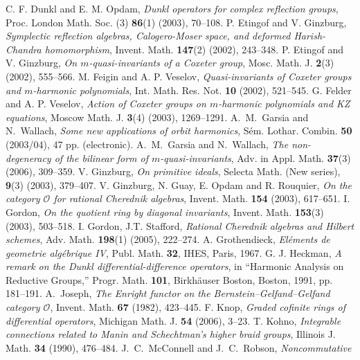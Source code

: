 \documentclass{amsart}
\theoremstyle{definition}
\theoremstyle{remark}
\numberwithin{equation}{section}
\begin{document}
\begin{thebibliography}{A}
C. F. Dunkl and E. M. Opdam, \textit{Dunkl operators for complex reflection groups}, Proc. London Math. Soc. (3) \textbf{86}(1) (2003), 70--108.
 P. Etingof and V. Ginzburg,
\textit{Symplectic reflection algebras, Calogero-Moser space, and deformed
Harish-Chandra homomorphism}, Invent. Math. \textbf{147}(2) (2002), 243--348.
  P. Etingof and V. Ginzburg, \textit{On $m$-quasi-invariants
of a Coxeter group}, Mosc. Math. J. \textbf{2}(3) (2002), 555--566.
M. Feigin and A. P. Veselov,
\textit{Quasi-invariants of Coxeter groups and $m$-harmonic polynomials},
Int. Math. Res. Not. \textbf{10} (2002), 521--545.
G. Felder  and A. P. Veselov, \textit{Action of Coxeter groups on $m$-harmonic polynomials
and KZ equations}, Moscow Math. J. \textbf{3}(4) (2003), 1269--1291.
A.~M.~Garsia and N.~Wallach, \textit{Some new applications of orbit harmonics},
S\'em. Lothar. Combin. \textbf{50} (2003/04), 47 pp. (electronic).
A.~M.~Garsia and N.~Wallach, \textit{The non-degeneracy of the bilinear
form of $m$-quasi-invariants},  Adv. in Appl. Math.
\textbf{37}(3) (2006), 309--359.
 V. Ginzburg, \textit{On primitive ideals}, Selecta
Math. (New series), \textbf{9}(3) (2003), 379--407.
V. Ginzburg, N. Guay, E. Opdam and R. Rouquier, \textit{On the category
$\mathcal O$ for rational Cherednik algebras}, Invent. Math. \textbf{154}
(2003), 617--651.
 I. Gordon,
\textit{On the quotient ring by diagonal invariants},
Invent. Math. \textbf{153}(3) (2003), 503--518.
 I. Gordon, J.T. Stafford, \textit{Rational
Cherednik algebras and Hilbert schemes}, Adv. Math. \textbf{198}(1)
(2005), 222--274.
 A. Grothendieck, \textit{El\'ements de geometrie
alg\'ebrique IV}, Publ. Math. \textbf{32}, IHES, Paris, 1967.
G. J. Heckman, \textit{A remark on the Dunkl differential-difference operators},
in ``Harmonic Analysis on Reductive Groups,''
Progr. Math. \textbf{101}, Birkh\"auser Boston, Boston, 1991, pp. 181--191.
A.~Joseph, \textit{The Enright functor on the
Bernstein--Gelfand--Gelfand category ${\mathcal{O}}$}, Invent. Math.
\textbf{67} (1982), 423--445.
 F. Knop, \textit{Graded cofinite rings of
differential operators}, Michigan Math. J. \textbf{54} (2006), 3--23.
T. Kohno, \textit{Integrable connections related to Manin and
Schechtman's higher braid groups}, Illinois J. Math.
\textbf{34} (1990), 476--484.
J.~C.~McConnell and J.~C.~Robson, \textit{Noncommutative
}
\end{thebibliography}
\end{document}

